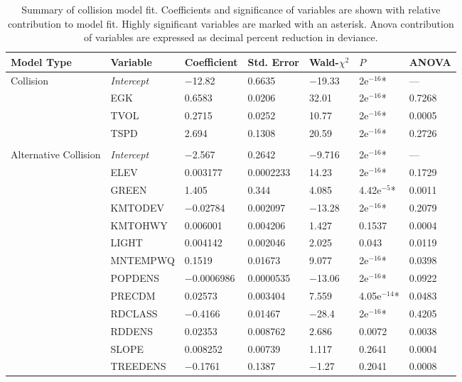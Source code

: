 \begin{table}[htp]
\caption[Summary of collision and alternative collision models]{Summary of collision model fit. Coefficients and significance of variables are shown with relative contribution to model fit. Highly significant variables are marked with an asterisk. Anova contribution of variables are expressed as decimal percent reduction in deviance.}
\begin{tabularx}{0.9\textwidth}{lllllll} \toprule
Model Type &Variable         &Coefficient &Std. Error			&Wald-{\large$\chi$}$^2$ &{\normalsize$P$} &ANOVA\\ \midrule 
Collision  				&\emph{Intercept}	& $-$12.82			& 0.6635   	& $-$19.33	&\TL 2e$^{-16}$*	& --- \\
           				& EGK				& 0.6583			& 0.0206   	& 32.01		&\TL 2e$^{-16}$*	& 0.7268 \\
           				& TVOL				& 0.2715			& 0.0252   	& 10.77		&\TL 2e$^{-16}$*	& 0.0005 \\
           				& TSPD				& 2.694				& 0.1308   	& 20.59		&\TL 2e$^{-16}$*	& 0.2726 \\
           				&                  	&                 	&         	&         	&       	& \\
Alternative Collision	& \emph{Intercept} 	& $-$2.567 			& 0.2642	& $-$9.716 	&\TL 2e$^{-16}$*	& --- \\ 
   						& ELEV				& 0.003177			& 0.0002233	& 14.23 	&\TL 2e$^{-16}$*	& 0.1729 \\ 
   						& GREEN				& 1.405				& 0.344 	& 4.085		& 4.42e$^{-5}$*	& 0.0011 \\ 
   						& KMTODEV			& $-$0.02784			& 0.002097 	& $-$13.28 	&\TL 2e$^{-16}$*	& 0.2079 \\ 
   						& KMTOHWY			& 0.006001			& 0.004206 	& 1.427 	& 0.1537 	& 0.0004 \\ 
   						& LIGHT				& 0.004142			& 0.002046 	& 2.025 	& 0.043 	& 0.0119 \\ 
   						& MNTEMPWQ			& 0.1519			& 0.01673 	& 9.077 	&\TL 2e$^{-16}$*	& 0.0398 \\ 
   						& POPDENS			& $-$0.0006986		& 0.0000535	& $-$13.06 	&\TL 2e$^{-16}$*	& 0.0922 \\ 
   						& PRECDM			& 0.02573			& 0.003404 	& 7.559 	& 4.05e$^{-14}$*	& 0.0483 \\ 
   						& RDCLASS			& $-$0.4166			& 0.01467 	& $-$28.4 	&\TL 2e$^{-16}$*	& 0.4205 \\ 
   						& RDDENS			& 0.02353			& 0.008762 	& 2.686 	& 0.0072 	& 0.0038 \\ 
   						& SLOPE				& 0.008252			& 0.00739 	& 1.117 	& 0.2641	& 0.0004 \\ 
   						& TREEDENS			& $-$0.1761			& 0.1387 	& $-$1.27 	& 0.2041	& 0.0008 \\ 
\bottomrule
\end{tabularx}
\label{egk_sum_coll}
\end{table}

